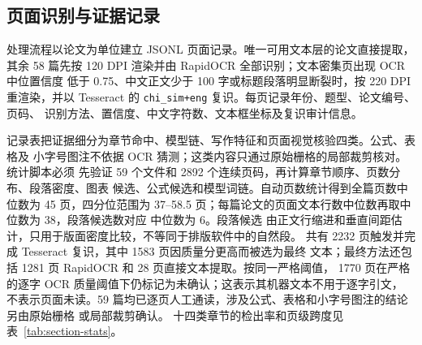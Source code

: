 \subsection{页面识别与证据记录}

处理流程以论文为单位建立 JSONL 页面记录。唯一可用文本层的论文直接提取，其余
58 篇先按 120 DPI 渲染并由 RapidOCR 全部识别；文本密集页出现 OCR 中位置信度
低于 0.75、中文正文少于 100 字或标题段落明显断裂时，按 220 DPI 重渲染，并以
Tesseract 的 \texttt{chi\_sim+eng} 复识。每页记录年份、题型、论文编号、页码、
识别方法、置信度、中文字符数、文本框坐标及复识审计信息。

记录表把证据细分为章节命中、模型链、写作特征和页面视觉核验四类。公式、表格及
小字号图注不依据 OCR 猜测；这类内容只通过原始栅格的局部裁剪核对。统计脚本必须
先验证 59 个文件和 2892 个连续页码，再计算章节顺序、页数分布、段落密度、图表
候选、公式候选和模型词链。自动页数统计得到全篇页数中位数为 45 页，四分位范围为
37--58.5 页；每篇论文的页面文本行数中位数再取中位数为 38，段落候选数对应
中位数为 6。段落候选
由正文行缩进和垂直间距估计，只用于版面密度比较，不等同于排版软件中的自然段。
共有 2232 页触发并完成 Tesseract 复识，其中 1583 页因质量分更高而被选为最终
文本；最终方法还包括 1281 页 RapidOCR 和 28 页直接文本提取。按同一严格阈值，
1770 页在严格的逐字 OCR 质量阈值下仍标记为未确认；这表示其机器文本不用于逐字引文，
不表示页面未读。59 篇均已逐页人工通读，涉及公式、表格和小字号图注的结论另由原始栅格
或局部裁剪确认。
十四类章节的检出率和页级跨度见表~\ref{tab:section-stats}。

